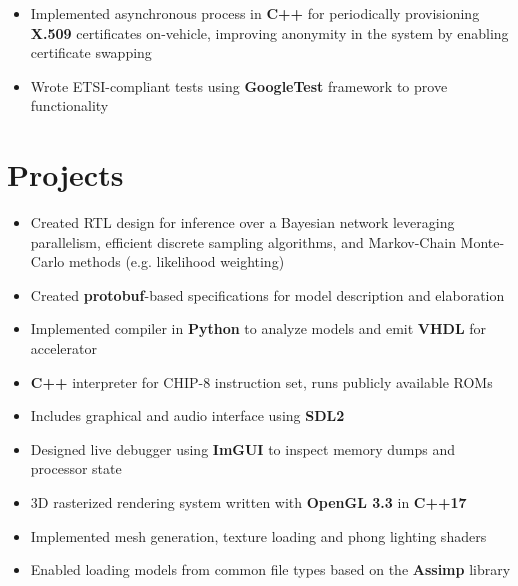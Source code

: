 \documentclass{moderncv}
\begin{document}
{\begin{itemize}
    \item Implemented asynchronous process in \textbf{C++} for periodically provisioning \textbf{X.509} certificates on-vehicle, improving anonymity in the system by enabling certificate swapping
    \item Wrote ETSI-compliant tests using \textbf{GoogleTest} framework to prove functionality
\end{itemize}}


\section{Projects}
{\begin{itemize}
    \item Created RTL design for inference over a Bayesian network leveraging parallelism, efficient discrete sampling algorithms, and Markov-Chain Monte-Carlo methods (e.g. likelihood weighting)
    \item Created \textbf{protobuf}-based specifications for model description and elaboration
    \item Implemented compiler in \textbf{Python} to analyze models and emit \textbf{VHDL} for accelerator
\end{itemize}}

{\begin{itemize}
    \item \textbf{C++} interpreter for CHIP-8 instruction set, runs publicly available ROMs
    \item Includes graphical and audio interface using \textbf{SDL2}
    \item Designed live debugger using \textbf{ImGUI} to inspect memory dumps and processor state
\end{itemize}}

{\begin{itemize}
    \item 3D rasterized rendering system written with \textbf{OpenGL 3.3} in \textbf{C++17}
    \item Implemented mesh generation, texture loading and phong lighting shaders
    \item Enabled loading models from common file types based on the \textbf{Assimp} library
\end{itemize}}
\end{document}
